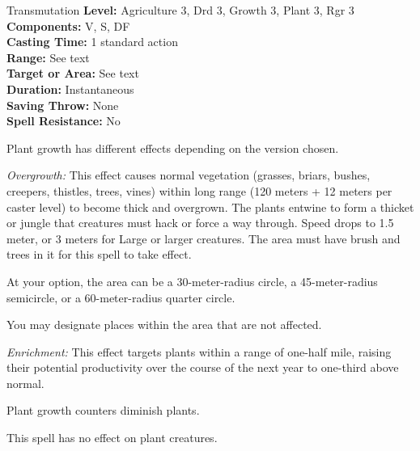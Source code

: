{Transmutation}
{
	\textbf{Level:}
	Agriculture 3, Drd 3, Growth 3, Plant 3, Rgr 3\\
	\textbf{Components:}
	V, S, DF\\
	\textbf{Casting Time:}
	1 standard action\\
	\textbf{Range:}
	See text\\
	\textbf{Target or Area:}
	See text\\
	\textbf{Duration:}
	Instantaneous\\
	\textbf{Saving Throw:}
	None\\
	\textbf{Spell Resistance:}
	No\\
}
{
	Plant growth has different effects depending on the version chosen.

	\textit{Overgrowth:}
	This effect causes normal vegetation (grasses, briars, bushes, creepers, thistles, trees, vines) within long range (120 meters + 12 meters per caster level) to become thick and overgrown. The plants entwine to form a thicket or jungle that creatures must hack or force a way through. Speed drops to 1.5 meter, or 3 meters for Large or larger creatures. The area must have brush and trees in it for this spell to take effect.

	At your option, the area can be a 30-meter-radius circle, a 45-meter-radius semicircle, or a 60-meter-radius quarter circle.

	You may designate places within the area that are not affected.

	\textit{Enrichment:}
	This effect targets plants within a range of one-half mile, raising their potential productivity over the course of the next year to one-third above normal.

	Plant growth counters diminish plants.

	This spell has no effect on plant creatures.

}
